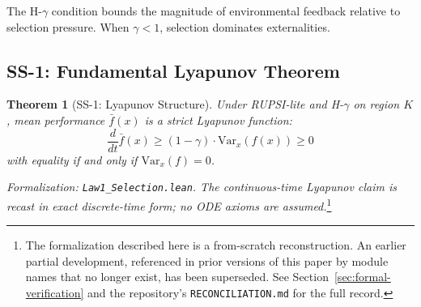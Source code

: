 \documentclass[12pt]{article}
\newtheorem{theorem}{Theorem}[section]
\newcommand{\Var}{\mathrm{Var}}
\begin{document}
The H-$\gamma$ condition bounds the magnitude of environmental feedback relative to selection pressure. When $\gamma < 1$, selection dominates externalities.

\subsection{SS-1: Fundamental Lyapunov Theorem}

\begin{theorem}[SS-1: Lyapunov Structure]
\label{thm:ss1}
Under RUPSI-lite and H-$\gamma$ on region $K$, mean performance $\bar{f}(x)$ is a strict Lyapunov function:
\[
\frac{d}{dt} \bar{f}(x) \geq (1 - \gamma) \cdot \Var_x(f(x)) \geq 0
\]
with equality if and only if $\Var_x(f) = 0$.
\end{theorem}
\noindent\textit{Formalization: \texttt{Law1\_Selection.lean}. The continuous-time Lyapunov claim is recast in exact discrete-time form; no ODE axioms are assumed.}\footnote{\label{fn:formal}The formalization described here is a from-scratch reconstruction. An earlier partial development, referenced in prior versions of this paper by module names that no longer exist, has been superseded. See Section~\ref{sec:formal-verification} and the repository's \texttt{RECONCILIATION.md} for the full record.}
\end{document}
